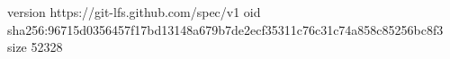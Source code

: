 version https://git-lfs.github.com/spec/v1
oid sha256:96715d0356457f17bd13148a679b7de2ecf35311c76c31c74a858c85256bc8f3
size 52328
